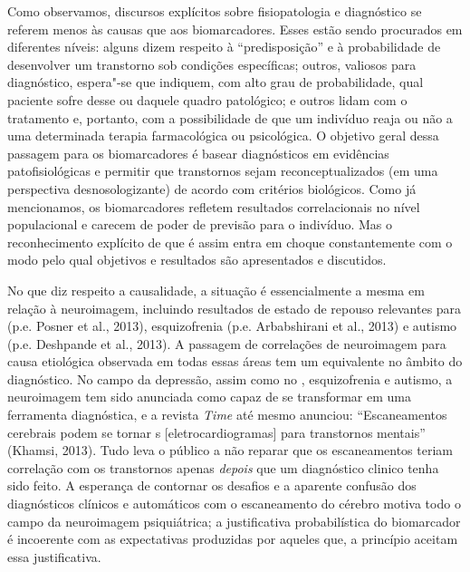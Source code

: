 Como observamos, discursos explícitos sobre fisiopatologia e diagnóstico
se referem menos às causas que aos biomarcadores. Esses estão sendo
procurados em diferentes níveis: alguns dizem respeito à
``predisposição'' e à probabilidade de desenvolver um transtorno sob
condições específicas; outros, valiosos para diagnóstico, espera"-se que
indiquem, com alto grau de probabilidade, qual paciente sofre desse ou
daquele quadro patológico; e outros lidam com o tratamento e, portanto,
com a possibilidade de que um indivíduo reaja ou não a uma determinada
terapia farmacológica ou psicológica. O objetivo geral dessa passagem
para os biomarcadores é basear diagnósticos em evidências
patofisiológicas e permitir que transtornos sejam reconceptualizados (em
uma perspectiva desnosologizante) de acordo com critérios biológicos.
Como já mencionamos, os biomarcadores refletem resultados correlacionais
no nível populacional e carecem de poder de previsão para o indivíduo.
Mas o reconhecimento explícito de que é assim entra em choque
constantemente com o modo pelo qual objetivos e resultados são
apresentados e discutidos.

No que diz respeito a causalidade, a situação é essencialmente a mesma
em relação à neuroimagem, incluindo resultados de estado de repouso
relevantes para  (p.e. Posner et al., 2013), esquizofrenia (p.e.
Arbabshirani et al., 2013) e autismo (p.e. Deshpande et al., 2013). A
passagem de correlações de neuroimagem para causa etiológica observada
em todas essas áreas tem um equivalente no âmbito do diagnóstico. No
campo da depressão, assim como no , esquizofrenia e autismo, a
neuroimagem tem sido anunciada como capaz de se transformar em uma
ferramenta diagnóstica, e a revista \emph{Time} até mesmo anunciou:
``Escaneamentos cerebrais podem se tornar s {[}eletrocardiogramas{]}
para transtornos mentais'' (Khamsi, 2013). Tudo leva o público a não
reparar que os escaneamentos teriam correlação com os transtornos apenas
\emph{depois} que um diagnóstico clinico tenha sido feito. A esperança
de contornar os desafios e a aparente confusão dos diagnósticos clínicos
e automáticos com o escaneamento do cérebro motiva todo o campo da
neuroimagem psiquiátrica; a justificativa probabilística do biomarcador
é incoerente com as expectativas produzidas por aqueles que, a princípio
aceitam essa justificativa.

